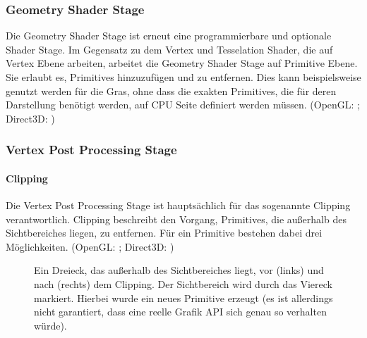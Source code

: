 \subsubsection{Geometry Shader Stage}
Die Geometry Shader Stage ist erneut eine programmierbare und optionale Shader Stage. Im Gegensatz zu dem Vertex und Tesselation Shader, die auf Vertex Ebene arbeiten, arbeitet die Geometry Shader Stage auf Primitive Ebene. Sie erlaubt es, Primitives hinzuzufügen und zu entfernen. Dies kann beispielsweise genutzt werden für die Gras, ohne dass die exakten Primitives, die für deren Darstellung benötigt werden, auf CPU Seite definiert werden müssen\cite{geometry_shader_grass_prototype}. (OpenGL: \cite{stage_gl_geometry_shader}; Direct3D: \cite{stage_d3d_geometry_shader})

\subsubsection{Vertex Post Processing Stage}
\label{sec:shaderpipeline:stages:vertexpp}
\paragraph{Clipping}
Die Vertex Post Processing Stage ist hauptsächlich für das sogenannte Clipping verantwortlich. Clipping beschreibt den Vorgang, Primitives, die außerhalb des Sichtbereiches liegen, zu entfernen. Für ein Primitive bestehen dabei drei Möglichkeiten. (OpenGL: \cite{stage_gl_vertex_pp}; Direct3D: \cite{stage_d3d_vertex_pp})

\begin{figure}
    \caption{Ein Dreieck, das außerhalb des Sichtbereiches liegt, vor (links) und nach (rechts) dem Clipping. Der Sichtbereich wird durch das Viereck markiert. Hierbei wurde ein neues Primitive erzeugt (es ist allerdings nicht garantiert, dass eine reelle Grafik API sich genau so verhalten würde).}
    \label{fig:clipping}
    \begin{center}
        \hspace{1cm}
    \end{center}
\end{figure}

